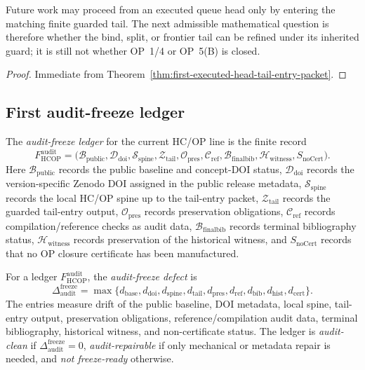 \begin{corollary}
\label{cor:tail-entry-working-rule}
Future work may proceed from an executed queue head only by entering the matching finite guarded tail. The next admissible mathematical question is therefore whether the bind, split, or frontier tail can be refined under its inherited guard; it is still not whether OP~1/4 or OP~5(B) is closed.
\end{corollary}

\begin{proof}
Immediate from Theorem~\ref{thm:first-executed-head-tail-entry-packet}.
\end{proof}

\subsection{First audit-freeze ledger}
\label{subsec:first-audit-freeze-ledger}

\begin{definition}
\label{def:first-audit-freeze-ledger}
The \emph{audit-freeze ledger} for the current HC/OP line is the finite record
\[
 F_{\mathrm{HCOP}}^{\mathrm{audit}}
 =
 \bigl(
 \mathcal B_{\mathrm{public}},
 \mathcal D_{\mathrm{doi}},
 \mathcal S_{\mathrm{spine}},
 \mathcal Z_{\mathrm{tail}},
 \mathcal O_{\mathrm{pres}},
 \mathcal C_{\mathrm{ref}},
 \mathcal B_{\mathrm{finalbib}},
 \mathcal H_{\mathrm{witness}},
 S_{\mathrm{noCert}}
 \bigr).
\]
Here \(\mathcal B_{\mathrm{public}}\) records the public baseline and concept-DOI status, \(\mathcal D_{\mathrm{doi}}\) records the version-specific Zenodo DOI assigned in the public release metadata, \(\mathcal S_{\mathrm{spine}}\) records the local HC/OP spine up to the tail-entry packet, \(\mathcal Z_{\mathrm{tail}}\) records the guarded tail-entry output, \(\mathcal O_{\mathrm{pres}}\) records preservation obligations, \(\mathcal C_{\mathrm{ref}}\) records compilation/reference checks as audit data, \(\mathcal B_{\mathrm{finalbib}}\) records terminal bibliography status, \(\mathcal H_{\mathrm{witness}}\) records preservation of the historical witness, and \(S_{\mathrm{noCert}}\) records that no OP closure certificate has been manufactured.
\end{definition}

\begin{definition}
\label{def:audit-freeze-defect}
For a ledger \(F_{\mathrm{HCOP}}^{\mathrm{audit}}\), the \emph{audit-freeze defect} is
\[
 \Delta_{\mathrm{audit}}^{\mathrm{freeze}}
 =
 \max
 \{d_{\mathrm{base}},d_{\mathrm{doi}},d_{\mathrm{spine}},d_{\mathrm{tail}},
 d_{\mathrm{pres}},d_{\mathrm{ref}},d_{\mathrm{bib}},d_{\mathrm{hist}},d_{\mathrm{cert}}\}.
\]
The entries measure drift of the public baseline, DOI metadata, local spine, tail-entry output, preservation obligations, reference/compilation audit data, terminal bibliography, historical witness, and non-certificate status. The ledger is \emph{audit-clean} if \(\Delta_{\mathrm{audit}}^{\mathrm{freeze}}=0\), \emph{audit-repairable} if only mechanical or metadata repair is needed, and \emph{not freeze-ready} otherwise.
\end{definition}

